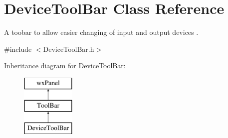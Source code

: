 \hypertarget{class_device_tool_bar}{}\section{Device\+Tool\+Bar Class Reference}
\label{class_device_tool_bar}


A toobar to allow easier changing of input and output devices .  




{\ttfamily \#include $<$Device\+Tool\+Bar.\+h$>$}

Inheritance diagram for Device\+Tool\+Bar\+:\begin{figure}[H]
\begin{center}
\leavevmode
\includegraphics[height=3.000000cm]{class_device_tool_bar}
\end{center}
\end{figure}
